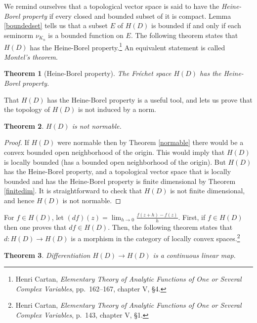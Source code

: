 \documentclass{article}
\newtheorem{theorem}{Theorem}
\begin{document}
We remind ourselves that a topological vector space is said to have the {\em Heine-Borel property} if every closed and bounded subset of it is compact. 
 Lemma \ref{boundedset} tells us that a subset $E$ of $H(D)$ is bounded if and only if each seminorm $\nu_{K_n}$ is a bounded function on $E$. 
 The following theorem states that $H(D)$ has the Heine-Borel property.\footnote{Henri Cartan, {\em Elementary Theory of Analytic Functions of One or Several Complex Variables},
pp.~162--167, chapter V, \S 4.} An equivalent statement is called {\em Montel's theorem}.

\begin{theorem}[Heine-Borel property]
The Fr\'echet space $H(D)$ has the Heine-Borel property.
\end{theorem}

That $H(D)$ has the Heine-Borel property is a useful tool, and lets us prove that the topology of $H(D)$ is not induced by a norm.

\begin{theorem}
$H(D)$ is not normable.
\end{theorem}
\begin{proof}
If $H(D)$ were normable then by Theorem \ref{normable} there would be a convex bounded open neighborhood of the origin. This would
imply that $H(D)$ is locally bounded (has a bounded open neighborhood of the origin). But $H(D)$ has the Heine-Borel property, and a topological
vector space that is locally bounded and has the Heine-Borel property is finite dimensional by Theorem \ref{finitedim}. It is straightforward to
check that $H(D)$ is not finite dimensional, and hence $H(D)$ is not normable.
\end{proof}




For $f \in H(D)$, let $(d f)(z)=\lim_{h \to 0} \frac{f(z+h)-f(z)}{h}$.
First, if $f \in H(D)$ then one proves that $df \in H(D)$.  Then,
the following theorem states that $d: H(D) \to H(D)$ is a morphism in the category of locally convex spaces.\footnote{Henri
Cartan,  {\em Elementary Theory of Analytic Functions of One or Several Complex Variables}, p.~143, chapter V, \S 1.}


\begin{theorem}
Differentiation $H(D) \to H(D)$ is a continuous linear map.
\end{theorem}
\end{document}
